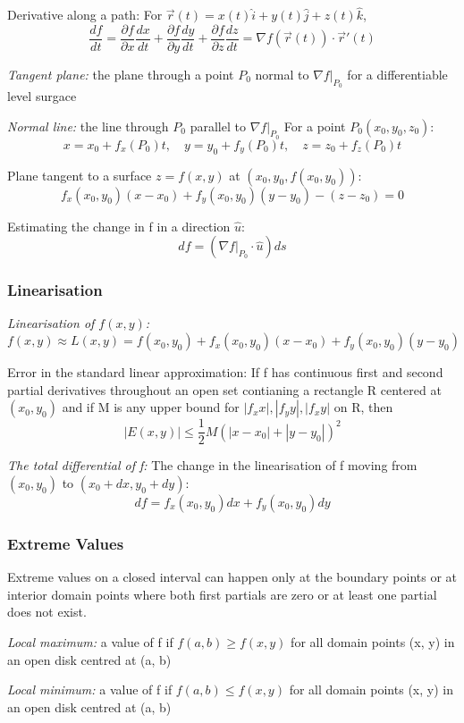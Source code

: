 \documentclass[12pt]{article}
\begin{document}
Derivative along a path:
For $\vec{r}(t) = x(t) \hat{i} + y(t) \hat{j} + z(t) \hat{k}$, 
\[ \frac{df}{dt} = \frac{\partial f}{\partial x} \frac{dx}{dt} + \frac{\partial f}{\partial y} \frac{dy}{dt} + \frac{\partial f}{\partial z} \frac{dz}{dt} = \nabla f(\vec{r}(t)) \cdot \vec{r}'(t)\]

\emph{Tangent plane:} the plane through a point $P_0$ normal to $\nabla f|_{P_0}$ for a differentiable level surgace

\emph{Normal line:} the line through $P_0$ parallel to $\nabla f|_{P_0}$
For a point $P_0(x_0, y_0, z_0)$:
\[ x = x_0 + f_x(P_0)t, \quad y = y_0 + f_y (P_0)t, \quad z = z_0 + f_z(P_0)t\]

Plane tangent to a surface $z = f(x, y)$ at $(x_0, y_0, f(x_0, y_0))$:
\[f_x (x_0, y_0)(x - x_0) + f_y(x_0, y_0)(y- y_0) - (z - z_0) = 0\]

Estimating the change in f in a direction $\hat{u}$:
\[df = (\nabla f|_{P_0} \cdot \hat{u}) ds\]

\subsubsection{Linearisation}
\emph{Linearisation of $f(x, y)$:}
\[f(x,y) \approx L(x,y) = f(x_0, y_0)+f_x(x_0,y_0)(x-x_0) + f_y(x_0, y_0)(y - y_0)\]

Error in the standard linear approximation:
If f has continuous first and second partial derivatives throughout an open set contianing a rectangle R centered at $(x_0, y_0)$ and if M is any upper bound for $|f_xx|, |f_yy|, |f_xy|$ on R, then 
\[|E(x,y)| \leq \frac{1}{2}M\left(|x-x_0| + |y - y_0|\right)^2 \]

\emph{The total differential of f:}
The change in the linearisation of f moving from $(x_0, y_0)$ to $(x_0 + dx, y_0 + dy)$:
\[ df = f_x(x_0, y_0) dx + f_y (x_0, y_0) dy \]

\subsubsection{Extreme Values}
Extreme values on a closed interval can happen only at the boundary points or at interior domain points where both first partials are zero or at least one partial does not exist. 

\emph{Local maximum:} a value of f if $f(a, b) \geq f(x, y)$ for all domain points (x, y) in an open disk centred at (a, b)

\emph{Local minimum:} a value of f if $f(a, b) \leq f(x, y)$ for all domain points (x, y) in an open disk centred at (a, b)
\end{document}
